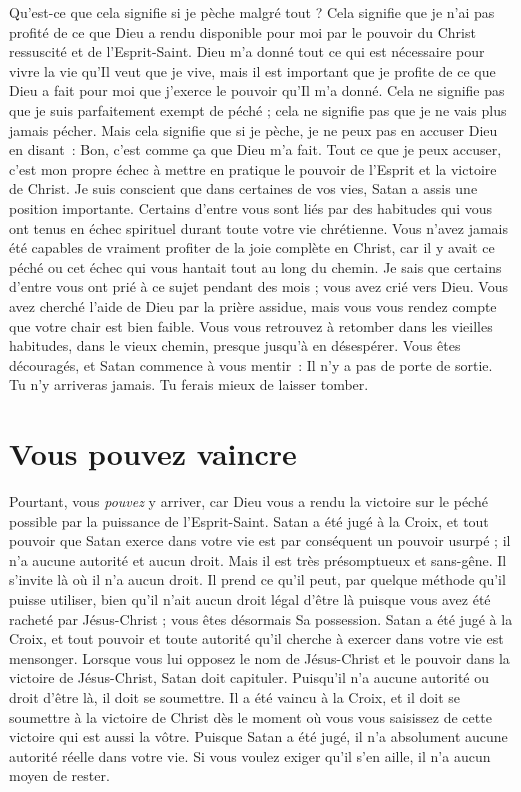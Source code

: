 Qu'est-ce que cela signifie si je pèche malgré tout ?
 Cela signifie que je n'ai pas profité de ce que Dieu a rendu disponible
 pour moi par le pouvoir du Christ ressuscité et de l'Esprit-Saint.
 Dieu m'a donné tout ce qui est nécessaire pour vivre la vie
 qu'Il veut que je vive, mais il est important que je profite
 de ce que Dieu a fait pour moi \ocadr que j'exerce le pouvoir
 qu'Il m'a donné.
 Cela ne signifie pas que je suis parfaitement exempt de péché ;
 cela ne signifie pas que je ne vais plus jamais pécher.
 Mais cela signifie que si je pèche, je ne peux pas en accuser Dieu
 en disant~:
 \og Bon, c'est comme ça que Dieu m'a fait. \fg{}
 Tout ce que je peux accuser, c'est mon propre échec à mettre en pratique
 le pouvoir de l'Esprit et la victoire de Christ.
 Je suis conscient que dans certaines de vos vies,
 Satan a assis une position importante.
 Certains d'entre vous sont liés par des habitudes qui vous ont tenus
 en échec spirituel durant toute votre vie chrétienne.
 Vous n'avez jamais été capables de vraiment profiter de la joie complète
 en Christ, car il y avait ce péché ou cet échec qui vous hantait
 tout au long du chemin. Je sais que certains d'entre vous ont prié
 à ce sujet pendant des mois ; vous avez crié vers Dieu.
 Vous avez cherché l'aide de Dieu par la prière assidue,
 mais vous vous rendez compte que votre chair est bien faible.
 Vous vous retrouvez à retomber dans les vieilles habitudes,
 dans le vieux chemin, presque jusqu'à en désespérer.
 Vous êtes découragés, et Satan commence à vous mentir~:
 \og Il n'y a pas de porte de sortie. Tu n'y arriveras jamais.
 Tu ferais mieux de laisser tomber. \fg{}


\section{Vous pouvez vaincre}

Pourtant, vous \emph{pouvez} y arriver, car Dieu vous a rendu la victoire
 sur le péché possible par la puissance de l'Esprit-Saint.
 Satan a été jugé à la Croix, et tout pouvoir que Satan exerce
 dans votre vie est par conséquent un pouvoir usurpé ;
 il n'a aucune autorité et aucun droit.
 Mais il est très présomptueux et sans-gêne. Il s'invite là où il n'a aucun
 droit. Il prend ce qu'il peut, par quelque méthode qu'il puisse utiliser,
 bien qu'il n'ait aucun droit légal d'être là puisque vous avez été racheté
 par Jésus-Christ ; vous êtes désormais Sa possession.
 Satan a été jugé à la Croix, et tout pouvoir et toute autorité qu'il cherche
 à exercer dans votre vie est mensonger.
 Lorsque vous lui opposez le nom de Jésus-Christ et le pouvoir
 dans la victoire de Jésus-Christ, Satan doit capituler.
 Puisqu'il n'a aucune autorité ou droit d'être là, il doit se soumettre.
 Il a été vaincu à la Croix, et il doit se soumettre à la victoire de Christ
 dès le moment où vous vous saisissez de cette victoire qui est aussi la vôtre.
 Puisque Satan a été jugé, il n'a absolument aucune autorité réelle
 dans votre vie. Si vous voulez exiger qu'il s'en aille,
 il n'a aucun moyen de rester.


